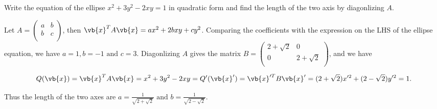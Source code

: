 \documentclass[a4paper,12pt]{report}
\begin{document}
{Write the equation of the ellipse \(x^2+3y^2-2xy=1\) in quadratic form and find the length of the two axis by diagonlizing \(A\). }
{Let \(A = \begin{pmatrix}
    a &  b \\
    b &  c \\
\end{pmatrix}\), then \(\vb{x} ^TA\vb{x} = ax^2 + 2bxy + cy^2\). Comparing the coefficients with the expression on the LHS of the ellipse equation, we have \(a = 1, b = -1 \text { and } c = 3\). Diagonlizing \(A\) gives the matrix \(B = \begin{pmatrix}
    2+\sqrt{2}  & 0  \\
    0 & 2+\sqrt{2}   \\
\end{pmatrix}\), and we have 

\begin{equation}
    Q(\vb{x} ) = \vb{x} ^TA\vb{x} = x^2+3y^2-2xy = Q'(\vb{x} ') = \vb{x} '^TB\vb{x} '= (2+\sqrt{2} )x'^2+(2-\sqrt{2} )y'^2 = 1.
\end{equation}

Thus the length of the two axes are \(a = \frac{1}{\sqrt{2+\sqrt{2 } }} \text { and } b = \frac{1}{\sqrt{2-\sqrt{2} } }  \). 
} 
\end{document}
